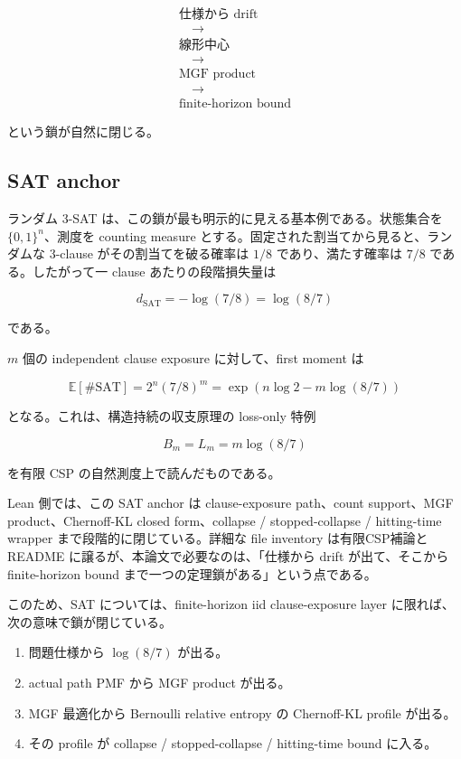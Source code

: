 \documentclass[12pt,a4paper]{article}
\begin{document}
\[
\begin{aligned}
\text{仕様から drift} \\
\quad\to\quad \\
\text{線形中心} \\
\quad\to\quad \\
\text{MGF product} \\
\quad\to\quad \\
\text{finite-horizon bound}
\end{aligned}
\]

という鎖が自然に閉じる。

\subsection{SAT anchor}\label{sat-anchor}

ランダム 3-SAT は、この鎖が最も明示的に見える基本例である。状態集合を \(\{0,1\}^n\)、測度を counting measure とする。固定された割当てから見ると、ランダムな 3-clause がその割当てを破る確率は \(1/8\) であり、満たす確率は \(7/8\) である。したがって一 clause あたりの段階損失量は

\[
d_{\mathrm{SAT}} = -\log(7/8) = \log(8/7)
\]

である。

\(m\) 個の independent clause exposure に対して、first moment は

\[
\mathbb E[\#\mathrm{SAT}] = 2^n(7/8)^m = \exp(n\log 2 - m\log(8/7))
\]

となる。これは、構造持続の収支原理の loss-only 特例

\[
B_{m}=L_{m}=m\log(8/7)
\]

を有限 CSP の自然測度上で読んだものである。

Lean 側では、この SAT anchor は clause-exposure path、count support、MGF product、Chernoff-KL closed form、collapse / stopped-collapse / hitting-time wrapper まで段階的に閉じている。詳細な file inventory は有限CSP補論と README に譲るが、本論文で必要なのは、「仕様から drift が出て、そこから finite-horizon bound まで一つの定理鎖がある」という点である。

このため、SAT については、finite-horizon iid clause-exposure layer に限れば、次の意味で鎖が閉じている。

\begin{enumerate}
\def\labelenumi{\arabic{enumi}.}
\tightlist
\item
  問題仕様から \(\log(8/7)\) が出る。
\item
  actual path PMF から MGF product が出る。
\item
  MGF 最適化から Bernoulli relative entropy の Chernoff-KL profile が出る。
\item
  その profile が collapse / stopped-collapse / hitting-time bound に入る。
\end{enumerate}
\end{document}
